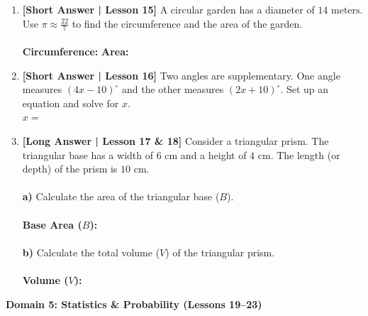 \documentclass[12pt, letterpaper, fleqn]{article}
\newcommand{\blanklong}{\underline{\hspace{6.5cm}}}
\begin{document}
\begin{enumerate}[leftmargin=0.6cm, itemsep=\fill, start=11]

\item \textbf{[Short Answer | Lesson 15]} A circular garden has a diameter of $14\text{ meters}$. Use $\pi \approx \frac{22}{7}$ to find the circumference and the area of the garden.
\\ \\
\textbf{Circumference:} \blanklong \quad \textbf{Area:} \blanklong

\item \textbf{[Short Answer | Lesson 16]} Two angles are supplementary. One angle measures $(4x - 10)^\circ$ and the other measures $(2x + 10)^\circ$. Set up an equation and solve for $x$.
\vspace{1.5cm} \\
\textbf{$x =$} \blanklong

\item \textbf{[Long Answer | Lesson 17 \& 18]} Consider a triangular prism. The triangular base has a width of $6\text{ cm}$ and a height of $4\text{ cm}$. The length (or depth) of the prism is $10\text{ cm}$.
\\ \\
\textbf{a)} Calculate the area of the triangular base ($B$).
\\ \\
\textbf{Base Area ($B$):} \blanklong \\ \\
\textbf{b)} Calculate the total volume ($V$) of the triangular prism.
\\ \\
\textbf{Volume ($V$):} \blanklong

\end{enumerate}

\vspace{0.5cm}

\begin{tcolorbox}[colback=teal!5, colframe=teal!60!black, arc=2mm]
    \textbf{Domain 5: Statistics \& Probability (Lessons 19--23)}
\end{tcolorbox}
\end{document}
